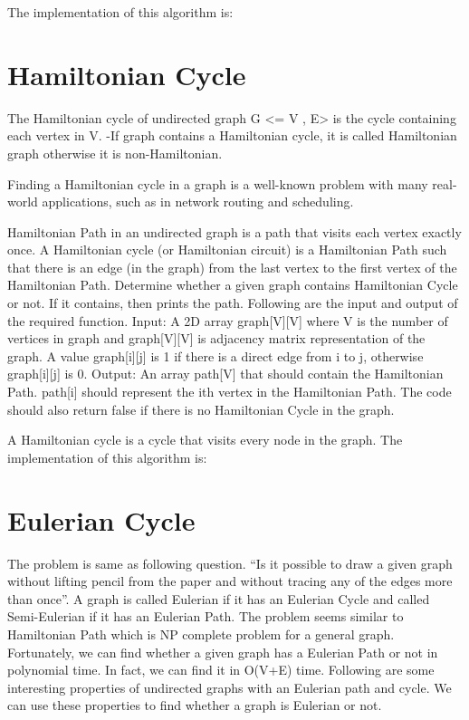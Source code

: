 The implementation of this algorithm is:



\section{Hamiltonian Cycle}

The Hamiltonian cycle of undirected graph G <= V , E> is the cycle containing each vertex in V. -If graph contains a Hamiltonian cycle, it is called Hamiltonian graph otherwise it is non-Hamiltonian.

Finding a Hamiltonian cycle in a graph is a well-known problem with many real-world applications, such as in network routing and scheduling.

Hamiltonian Path in an undirected graph is a path that visits each vertex exactly once. A Hamiltonian cycle (or Hamiltonian circuit) is a Hamiltonian Path such that there is an edge (in the graph) from the last vertex to the first vertex of the Hamiltonian Path. Determine whether a given graph contains Hamiltonian Cycle or not. If it contains, then prints the path. Following are the input and output of the required function.
Input: 
A 2D array graph[V][V] where V is the number of vertices in graph and graph[V][V] is adjacency matrix representation of the graph. A value graph[i][j] is 1 if there is a direct edge from i to j, otherwise graph[i][j] is 0.
Output: 
An array path[V] that should contain the Hamiltonian Path. path[i] should represent the ith vertex in the Hamiltonian Path. The code should also return false if there is no Hamiltonian Cycle in the graph.

A Hamiltonian cycle is a cycle that visits every node in the graph. The implementation of this algorithm is:




\section{Eulerian Cycle}

The problem is same as following question. “Is it possible to draw a given graph without lifting pencil from the paper and without tracing any of the edges more than once”.
A graph is called Eulerian if it has an Eulerian Cycle and called Semi-Eulerian if it has an Eulerian Path. The problem seems similar to Hamiltonian Path which is NP complete problem for a general graph. Fortunately, we can find whether a given graph has a Eulerian Path or not in polynomial time. In fact, we can find it in O(V+E) time. 
Following are some interesting properties of undirected graphs with an Eulerian path and cycle. We can use these properties to find whether a graph is Eulerian or not.

